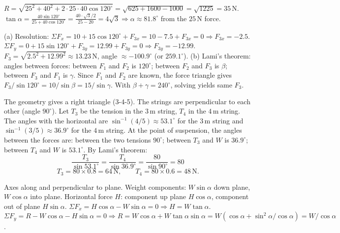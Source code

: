 \documentclass[11pt]{article}
\begin{document}
\begin{corrige}[Exercise 1]
\(R = \sqrt{25^2+40^2+2\cdot25\cdot40\cos120^\circ} = \sqrt{625+1600-1000} = \sqrt{1225} = 35\,\mathrm{N}\).
\(\tan\alpha = \frac{40\sin120^\circ}{25+40\cos120^\circ} = \frac{40\cdot\sqrt{3}/2}{25-20} = 4\sqrt{3} \Rightarrow \alpha \approx 81.8^\circ\) from the \(25\,\mathrm{N}\) force.
\end{corrige}

\begin{corrige}[Exercise 2]
(a) Resolution: \(\Sigma F_x = 10 + 15\cos120^\circ + F_{3x} = 10 - 7.5 + F_{3x} = 0 \Rightarrow F_{3x} = -2.5\).
\(\Sigma F_y = 0 + 15\sin120^\circ + F_{3y} = 12.99 + F_{3y} = 0 \Rightarrow F_{3y} = -12.99\).
\(F_3 = \sqrt{2.5^2+12.99^2} \approx 13.23\,\mathrm{N}\), angle \(\approx -100.9^\circ\) (or \(259.1^\circ\)).
(b) Lami's theorem: angles between forces: between \(F_1\) and \(F_2\) is \(120^\circ\); between \(F_2\) and \(F_3\) is \(\beta\); between \(F_3\) and \(F_1\) is \(\gamma\). Since \(F_1\) and \(F_2\) are known, the force triangle gives \(F_3/\sin120^\circ = 10/\sin\beta = 15/\sin\gamma\). With \(\beta+\gamma = 240^\circ\), solving yields same \(F_3\).
\end{corrige}

\begin{corrige}[Exercise 3]
The geometry gives a right triangle (3-4-5). The strings are perpendicular to each other (angle \(90^\circ\)). Let \(T_3\) be the tension in the \(3\,\mathrm{m}\) string, \(T_4\) in the \(4\,\mathrm{m}\) string. The angles with the horizontal are \(\sin^{-1}(4/5)\approx53.1^\circ\) for the \(3\,\mathrm{m}\) string and \(\sin^{-1}(3/5)\approx36.9^\circ\) for the \(4\,\mathrm{m}\) string. At the point of suspension, the angles between the forces are: between the two tensions \(90^\circ\); between \(T_3\) and \(W\) is \(36.9^\circ\); between \(T_4\) and \(W\) is \(53.1^\circ\). By Lami's theorem:
\[
\frac{T_3}{\sin53.1^\circ} = \frac{T_4}{\sin36.9^\circ} = \frac{80}{\sin90^\circ} = 80
\]
\[
T_3 = 80 \times 0.8 = 64\,\mathrm{N},\qquad T_4 = 80 \times 0.6 = 48\,\mathrm{N}.
\]
\end{corrige}

\begin{corrige}[Exercise 4]
Axes along and perpendicular to plane. Weight components: \(W\sin\alpha\) down plane, \(W\cos\alpha\) into plane. Horizontal force \(H\): component up plane \(H\cos\alpha\), component out of plane \(H\sin\alpha\).
\(\Sigma F_x = H\cos\alpha - W\sin\alpha = 0 \Rightarrow H = W\tan\alpha\).
\(\Sigma F_y = R - W\cos\alpha - H\sin\alpha = 0 \Rightarrow R = W\cos\alpha + W\tan\alpha\sin\alpha = W(\cos\alpha + \sin^2\alpha/\cos\alpha) = W/\cos\alpha\).
\end{corrige}
\end{document}
